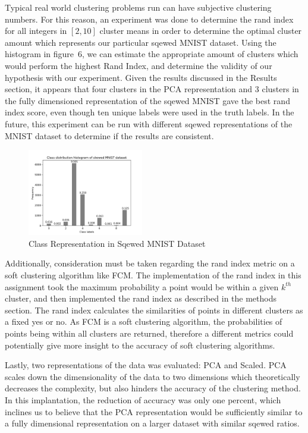 Typical real world clustering problems run can have subjective clustering numbers. For this reason, an experiment was done to determine the rand index for all integers in $[2,10]$ cluster means in order to determine the optimal cluster amount which represents our particular sqewed MNIST dataset. Using the histogram in figure~6, we can estimate the appropriate amount of clusters which would perform the highest Rand Index, and determine the validity of our hypothesis with our experiment. Given the results discussed in the Results section, it appears that four clusters in the PCA representation and 3 clusters in the fully dimensioned representation of the sqewed MNIST gave the best rand index score, even though ten unique labels were used in the truth labels. In the future, this experiment can be run with different sqewed representations of the MNIST dataset to determine if the results are consistent. \par

\begin{figure}[H]
    \centering
    \includegraphics[width=0.45\textwidth]{class_histogram.png}
    \caption{Class Representation in Sqewed MNIST Dataset\label{fig:hist1}}    
\end{figure}

Additionally, consideration must be taken regarding the rand index metric on a soft clustering algorithm like FCM. The implementation of the rand index in this assignment took the maximum probability a point would be within a given $k^{th}$ cluster, and then implemented the rand index as described in the methods section. The rand index calculates the similarities of points in different clusters as a fixed yes or no. As FCM is a soft clustering algorithm, the probabilities of points being within all clusters are returned, therefore a different metrics could potentially give more insight to the accuracy of soft clustering algorithms. \par

Lastly, two representations of the data was evaluated: PCA and Scaled. PCA scales down the dimensionality of the data to two dimensions which theoretically decreases the complexity, but also hinders the accuracy of the clustering method. In this implantation, the reduction of accuracy was only one percent, which inclines us to believe that the PCA representation would be sufficiently similar to a fully dimensional representation on a larger dataset with similar sqewed ratios. \par